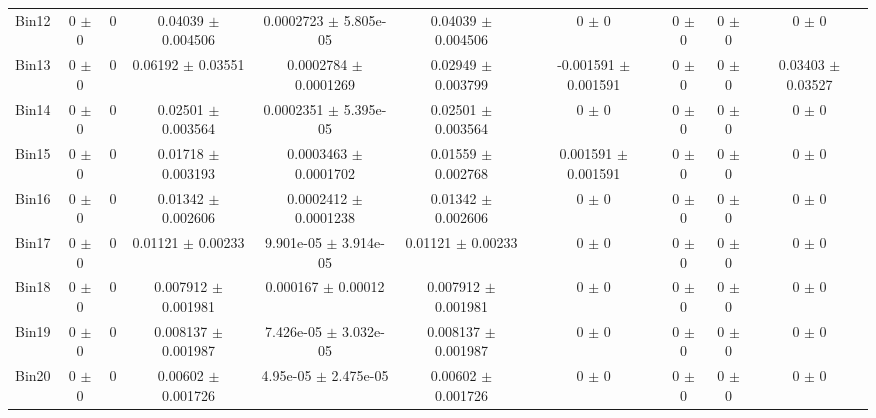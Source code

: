 \begin{tabular}{@{\extracolsep{4pt}}lccccccccc@{}}
     Bin12 & 0 $\pm$ 0 & 0 & 0.04039 $\pm$ 0.004506 & 0.0002723 $\pm$ 5.805e-05 & 0.04039 $\pm$ 0.004506 & 0 $\pm$ 0 & 0 $\pm$ 0 & 0 $\pm$ 0 & 0 $\pm$ 0 \\ 
     Bin13 & 0 $\pm$ 0 & 0 & 0.06192 $\pm$ 0.03551 & 0.0002784 $\pm$ 0.0001269 & 0.02949 $\pm$ 0.003799 & -0.001591 $\pm$ 0.001591 & 0 $\pm$ 0 & 0 $\pm$ 0 & 0.03403 $\pm$ 0.03527 \\ 
     Bin14 & 0 $\pm$ 0 & 0 & 0.02501 $\pm$ 0.003564 & 0.0002351 $\pm$ 5.395e-05 & 0.02501 $\pm$ 0.003564 & 0 $\pm$ 0 & 0 $\pm$ 0 & 0 $\pm$ 0 & 0 $\pm$ 0 \\ 
     Bin15 & 0 $\pm$ 0 & 0 & 0.01718 $\pm$ 0.003193 & 0.0003463 $\pm$ 0.0001702 & 0.01559 $\pm$ 0.002768 & 0.001591 $\pm$ 0.001591 & 0 $\pm$ 0 & 0 $\pm$ 0 & 0 $\pm$ 0 \\ 
     Bin16 & 0 $\pm$ 0 & 0 & 0.01342 $\pm$ 0.002606 & 0.0002412 $\pm$ 0.0001238 & 0.01342 $\pm$ 0.002606 & 0 $\pm$ 0 & 0 $\pm$ 0 & 0 $\pm$ 0 & 0 $\pm$ 0 \\ 
     Bin17 & 0 $\pm$ 0 & 0 & 0.01121 $\pm$ 0.00233 & 9.901e-05 $\pm$ 3.914e-05 & 0.01121 $\pm$ 0.00233 & 0 $\pm$ 0 & 0 $\pm$ 0 & 0 $\pm$ 0 & 0 $\pm$ 0 \\ 
     Bin18 & 0 $\pm$ 0 & 0 & 0.007912 $\pm$ 0.001981 & 0.000167 $\pm$ 0.00012 & 0.007912 $\pm$ 0.001981 & 0 $\pm$ 0 & 0 $\pm$ 0 & 0 $\pm$ 0 & 0 $\pm$ 0 \\ 
     Bin19 & 0 $\pm$ 0 & 0 & 0.008137 $\pm$ 0.001987 & 7.426e-05 $\pm$ 3.032e-05 & 0.008137 $\pm$ 0.001987 & 0 $\pm$ 0 & 0 $\pm$ 0 & 0 $\pm$ 0 & 0 $\pm$ 0 \\ 
     Bin20 & 0 $\pm$ 0 & 0 & 0.00602 $\pm$ 0.001726 & 4.95e-05 $\pm$ 2.475e-05 & 0.00602 $\pm$ 0.001726 & 0 $\pm$ 0 & 0 $\pm$ 0 & 0 $\pm$ 0 & 0 $\pm$ 0 \\ 
\hline\hline
  \end{tabular}
